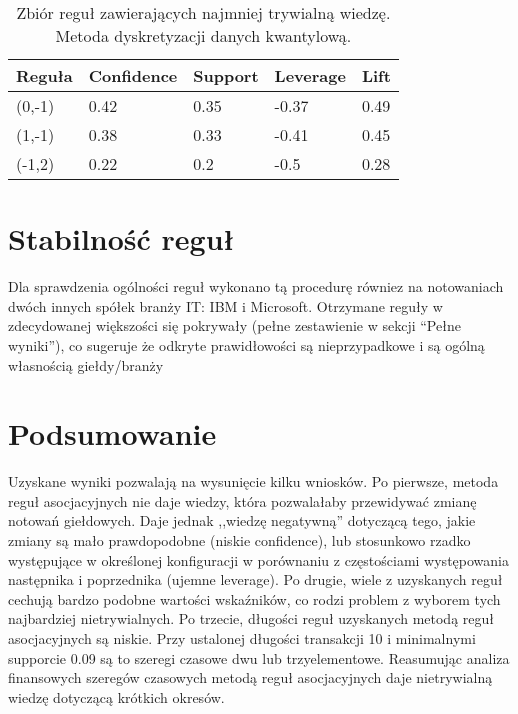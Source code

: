 \documentclass[a4paper,10pt]{article}
\begin{document}
\begin{center}
\begin{table}
\centering
\caption{Zbiór reguł zawierających najmniej trywialną wiedzę. Metoda dyskretyzacji danych kwantylową.}
\begin{tabular}{|l|l|l|l|l|} 
\hline
\bf{Reguła} & \bf{Confidence} & \bf{Support} & \bf{Leverage} & \bf{Lift} \\ \hline
(0,-1) & 0.42 & 0.35 & -0.37 & 0.49  \\ \hline
(1,-1) & 0.38 & 0.33 & -0.41 & 0.45 \\ \hline
(-1,2) & 0.22 & 0.2 & -0.5 & 0.28 \\ \hline
\end{tabular}
\label{tab:k2}
\end{table}
\end{center}

\section{Stabilność reguł}
Dla sprawdzenia ogólności reguł wykonano tą procedurę równiez na notowaniach dwóch innych spółek branży IT: IBM i Microsoft. 
Otrzymane reguły w zdecydowanej większości się pokrywały (pełne zestawienie w sekcji ``Pełne wyniki''), co sugeruje że odkryte prawidłowości są nieprzypadkowe i są ogólną własnością giełdy/branży

\section{Podsumowanie}
Uzyskane wyniki pozwalają na wysunięcie kilku wniosków. Po pierwsze, metoda reguł asocjacyjnych nie daje wiedzy, która pozwalałaby przewidywać zmianę notowań
giełdowych. Daje jednak ,,wiedzę negatywną'' dotyczącą tego, jakie zmiany są mało prawdopodobne (niskie confidence), lub stosunkowo rzadko występujące w określonej konfiguracji w porównaniu z częstościami występowania następnika i poprzednika (ujemne leverage). Po drugie, wiele z uzyskanych reguł cechują bardzo podobne wartości wskaźników, co rodzi problem z wyborem tych najbardziej 
nietrywialnych. Po trzecie, długości reguł uzyskanych metodą reguł asocjacyjnych są niskie. Przy ustalonej długości transakcji 10 i minimalnymi supporcie 0.09 są to szeregi czasowe dwu lub trzyelementowe. Reasumując analiza finansowych szeregów czasowych metodą reguł asocjacyjnych daje nietrywialną wiedzę dotyczącą krótkich okresów.
\end{document}
